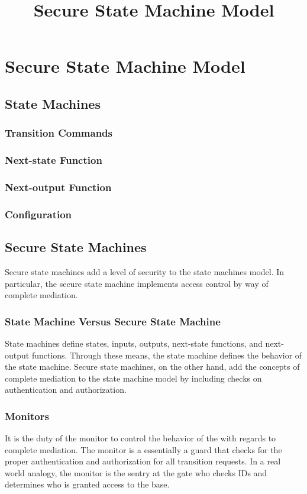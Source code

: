 \documentclass[../../main/main.tex]{subfiles}
\begin{document}
\title{Secure State Machine Model}

\chapter{Secure State Machine Model}\label{chp:ssmmodel}

\section{State Machines}\label{sec:sm}
\subsection{Transition Commands}
\subsection{Next-state Function}
\subsection{Next-output Function}
\subsection{Configuration}

\section{Secure State Machines}\label{sec:ssm}
Secure state machines add a level of security to the state machines model.  In particular, the secure state machine implements access control by way of complete mediation.   

\subsection{State Machine Versus Secure State Machine}
State machines define states, inputs, outputs, next-state functions, and next-output functions.  Through these means, the state machine defines the behavior of the state machine.  Secure state machines, on the other hand, add the concepts of complete mediation to the state machine model by including checks on authentication and authorization.

 
\subsection{Monitors}\label{monitors}
It is the duty of the monitor to control the behavior of the  with regards to complete mediation.  The monitor is a essentially a guard that checks for the proper authentication and authorization for all  transition requests.  In a real world analogy, the monitor is the sentry at the gate who checks IDs and determines who is granted access to the base.  
\end{document}
